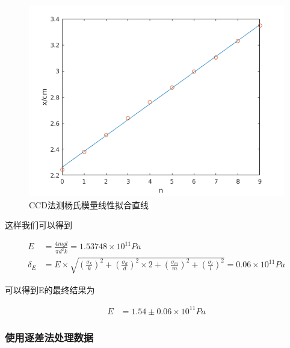 \documentclass[a4paper,10pt,notitlepage]{article}
\begin{document}
\begin{figure}
\centering
	\includegraphics[scale=0.7]{ym1.png}
	\caption{CCD法测杨氏模量线性拟合直线}
\end{figure}

	这样我们可以得到
	
\begin{align*}
	E &= \frac{4mgl}{\pi d^2k} = 1.53748 \times 10^{11} Pa \\
	\delta_E &= E \times \sqrt{(\frac{\sigma_{k}}{k})^2 + (\frac{\sigma_{d}}{d})^2\times 2 + (\frac{\sigma_{m}}{m})^2 + (\frac{\sigma_{l}}{l})^2} = 0.06 \times 10^{11} Pa 
\end{align*}

	可以得到E的最终结果为
	
\begin{align*}
	E &= 1.54 \pm 0.06 \times 10^{11} Pa
\end{align*}

\subsubsection{使用逐差法处理数据}
\end{document}
